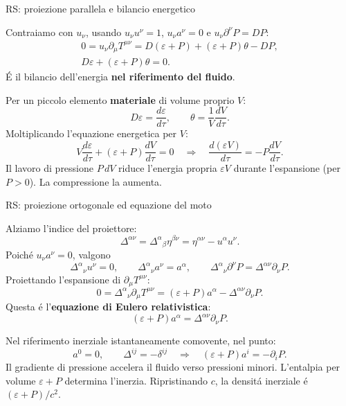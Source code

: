 \begin{frame}[t]{RS: proiezione parallela e bilancio energetico}
\small\raggedright
\setlength{\abovedisplayskip}{3pt plus 1pt minus 1pt}
\setlength{\belowdisplayskip}{3pt plus 1pt minus 1pt}
\setlength{\abovedisplayshortskip}{0pt plus 1pt}
\setlength{\belowdisplayshortskip}{2pt plus 1pt minus 1pt}
Contraiamo con $u_\nu$, usando
$u_\nu u^\nu=1$, $u_\nu a^\nu=0$ e $u_\nu\partial^\nu P=DP$:
\[
\begin{gathered}
0=u_\nu\partial_\mu T^{\mu\nu}
=D(\varepsilon+P)+(\varepsilon+P)\theta-DP,\\[2pt]
\boxed{D\varepsilon+(\varepsilon+P)\theta=0.}
\end{gathered}
\]
\'E il bilancio dell'energia \textbf{nel riferimento del fluido}.

\medskip
Per un piccolo elemento \textbf{materiale} di volume proprio $V$:
\[
D\varepsilon=\frac{d\varepsilon}{d\tau},\qquad
\theta=\frac1V\frac{dV}{d\tau}.
\]
Moltiplicando l'equazione energetica per $V$:
\[
V\frac{d\varepsilon}{d\tau}
+(\varepsilon+P)\frac{dV}{d\tau}=0
\quad\Longrightarrow\quad
\boxed{\frac{d(\varepsilon V)}{d\tau}
=-P\frac{dV}{d\tau}}.
\]
Il lavoro di pressione $P\,dV$ riduce l'energia propria $\varepsilon V$
durante l'espansione (per $P>0$). La compressione la aumenta.
\end{frame}

\begin{frame}[t]{RS: proiezione ortogonale ed equazione del moto}
\small\raggedright
\setlength{\abovedisplayskip}{3pt plus 1pt minus 1pt}
\setlength{\belowdisplayskip}{3pt plus 1pt minus 1pt}
\setlength{\abovedisplayshortskip}{0pt plus 1pt}
\setlength{\belowdisplayshortskip}{2pt plus 1pt minus 1pt}
Alziamo l'indice del proiettore:
\[
\Delta^{\alpha\nu}
=\Delta^\alpha{}_\beta\eta^{\beta\nu}
=\eta^{\alpha\nu}-u^\alpha u^\nu.
\]
Poich\'e $u_\nu a^\nu=0$, valgono
\[
\Delta^\alpha{}_\nu u^\nu=0,\qquad
\Delta^\alpha{}_\nu a^\nu=a^\alpha,\qquad
\Delta^\alpha{}_\nu\partial^\nu P=\Delta^{\alpha\nu}\partial_\nu P.
\]
Proiettando l'espansione di $\partial_\mu T^{\mu\nu}$:
\[
0=\Delta^\alpha{}_\nu\partial_\mu T^{\mu\nu}
=(\varepsilon+P)a^\alpha-\Delta^{\alpha\nu}\partial_\nu P.
\]
Questa \'e l'\textbf{equazione di Eulero relativistica}:
\[
\boxed{(\varepsilon+P)a^\alpha=\Delta^{\alpha\nu}\partial_\nu P.}
\]

\medskip
Nel riferimento inerziale istantaneamente comovente, nel punto:
\[
a^0=0,\qquad \Delta^{ij}=-\delta^{ij}
\quad\Longrightarrow\quad
\boxed{(\varepsilon+P)a^i=-\partial_iP.}
\]
Il gradiente di pressione accelera il fluido verso pressioni minori.
L'entalpia per volume $\varepsilon+P$ determina l'inerzia.
Ripristinando $c$, la densit\'a inerziale \'e $(\varepsilon+P)/c^2$.
\end{frame}

